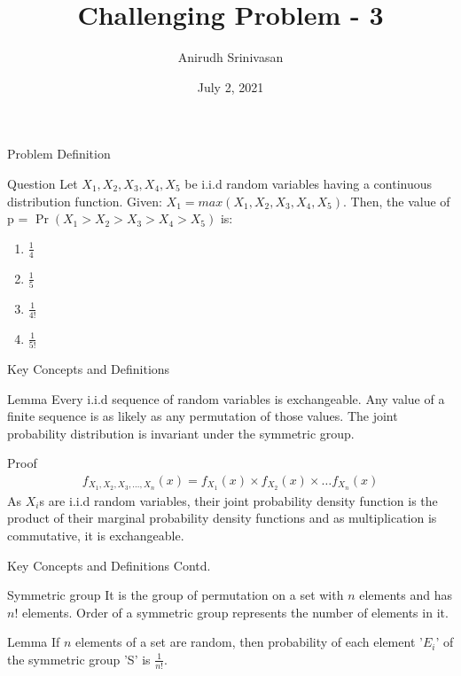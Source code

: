\documentclass{beamer}
\title{Challenging Problem - 3}
\author{Anirudh Srinivasan}
\institute{IIT Hyderabad}
\date{July 2, 2021}
\providecommand{\pr}[1]{\ensuremath{\Pr\left(#1\right)}}
\begin{document}
\begin{frame}
\titlepage
\end{frame}
\begin{frame}{Problem Definition}
\begin{block}{Question}
Let $X_1, X_2, X_3, X_4, X_5$ be i.i.d random variables having a continuous distribution function. Given: $X_1 = max(X_1,X_2,X_3,X_4,X_5)$. Then, the value of p = $\pr{X_1 > X_2 > X_3 > X_4 > X_5}$ is:

\begin{enumerate}
     \item $\frac{1}{4}$
     \item $\frac{1}{5}$
     \item $\frac{1}{4!}$
     \item $\frac{1}{5!}$
\end{enumerate}
\end{block}
\end{frame}

\begin{frame}{Key Concepts and Definitions}
\begin{block}{Lemma}
Every i.i.d sequence of random variables is exchangeable. 
Any value of a finite sequence is as likely as any permutation of those values. The joint probability distribution is invariant under the symmetric group.
\end{block}    
\begin{block}{Proof}
\begin{align}
    f_{X_1,X_2,X_3,\dots,X_n}(x) = f_{X_1}(x) \times f_{X_2}(x) \times \dots f_{X_n}(x) 
\end{align}
As $X_i$s are i.i.d random variables, their joint probability density function is the product of their marginal probability density functions and as multiplication is commutative, it is exchangeable.
\end{block}

\end{frame}

\begin{frame}{Key Concepts and Definitions Contd.}
\begin{block}{Symmetric group}
It is the group of permutation on a set with $n$ elements and has $n!$ elements. Order of a symmetric group represents the number of elements in it.
\end{block} 
\begin{block}{Lemma}
If $n$ elements of a set are random, then probability of each element '$E_i$' of the symmetric group 'S' is $\frac{1}{n!}$.
\end{block}

\end{frame}
\end{document}
